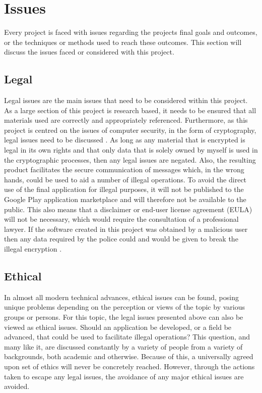 \documentclass[a4paper,12pt]{report}
\begin{document}
\section{Issues}

Every project is faced with issues regarding the projects final goals and outcomes, or the techniques or methods used to reach these outcomes. This section will discuss the issues faced or considered with this project. 

\subsection{Legal}

Legal issues are the main issues that need to be considered within this project. As a large section of this project is research based, it needs to be ensured that all materials used are correctly and appropriately referenced. Furthermore, as this project is centred on the issues of computer security, in the form of cryptography, legal issues need to be discussed \cite{dataprotect} \cite{internetlaw}. As long as any material that is encrypted is legal in its own rights and that only data that is solely owned by myself is used in the cryptographic processes, then any legal issues are negated. Also, the resulting product facilitates the secure communication of messages which, in the wrong hands, could be used to aid a number of illegal operations. To avoid the direct use of the final application for illegal purposes, it will not be published to the Google Play application marketplace and will therefore not be available to the public. This also means that a disclaimer or end-user license agreement (EULA) will not be necessary, which would require the consultation of a professional lawyer. If the software created in this project was obtained by a malicious user then any data required by the police could and would be given to break the illegal encryption \cite{pcworldart}.

\subsection{Ethical}

In almost all modern technical advances, ethical issues can be found, posing unique problems depending on the perception or views of the topic by various groups or persons. For this topic, the legal issues presented above can also be viewed as ethical issues. Should an application be developed, or a field be advanced, that could be used to facilitate illegal operations? This question, and many like it, are discussed constantly by a variety of people from a variety of backgrounds, both academic and otherwise. Because of this, a universally agreed upon set of ethics will never be concretely reached. However, through the actions taken to escape any legal issues, the avoidance of any major ethical issues are avoided. 
\end{document}
